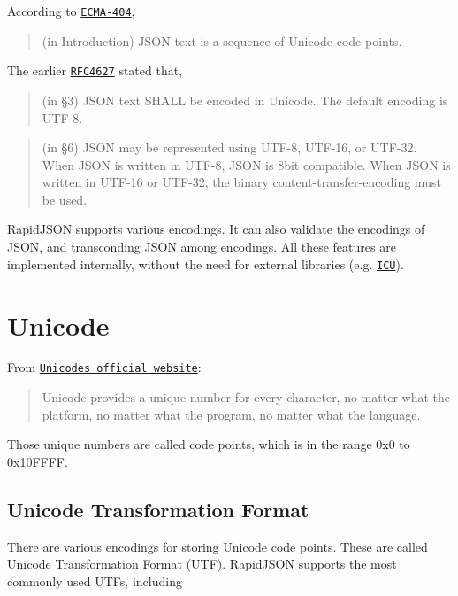 According to \href{http://www.ecma-international.org/publications/files/ECMA-ST/ECMA-404.pdf}{\tt E\+C\+M\+A-\/404},

\begin{quote}
(in Introduction) J\+S\+ON text is a sequence of Unicode code points. \end{quote}


The earlier \href{http://www.ietf.org/rfc/rfc4627.txt}{\tt R\+F\+C4627} stated that,

\begin{quote}
(in §3) J\+S\+ON text S\+H\+A\+LL be encoded in Unicode. The default encoding is U\+T\+F-\/8. \end{quote}


\begin{quote}
(in §6) J\+S\+ON may be represented using U\+T\+F-\/8, U\+T\+F-\/16, or U\+T\+F-\/32. When J\+S\+ON is written in U\+T\+F-\/8, J\+S\+ON is 8bit compatible. When J\+S\+ON is written in U\+T\+F-\/16 or U\+T\+F-\/32, the binary content-\/transfer-\/encoding must be used. \end{quote}


Rapid\+J\+S\+ON supports various encodings. It can also validate the encodings of J\+S\+ON, and transconding J\+S\+ON among encodings. All these features are implemented internally, without the need for external libraries (e.\+g. \href{http://site.icu-project.org/}{\tt I\+CU}).\hypertarget{md_Commun_Externe_RapidJSON_doc_encoding.zh-cn_Unicode}{}\section{Unicode}\label{md_Commun_Externe_RapidJSON_doc_encoding.zh-cn_Unicode}
From \href{http://www.unicode.org/standard/WhatIsUnicode.html}{\tt Unicode\textquotesingle{}s official website}\+: \begin{quote}
Unicode provides a unique number for every character, no matter what the platform, no matter what the program, no matter what the language. \end{quote}


Those unique numbers are called code points, which is in the range {\ttfamily 0x0} to {\ttfamily 0x10\+F\+F\+FF}.\hypertarget{md_Commun_Externe_RapidJSON_doc_encoding.zh-cn_UTF}{}\subsection{Unicode Transformation Format}\label{md_Commun_Externe_RapidJSON_doc_encoding.zh-cn_UTF}
There are various encodings for storing Unicode code points. These are called Unicode Transformation Format (U\+TF). Rapid\+J\+S\+ON supports the most commonly used U\+T\+Fs, including


